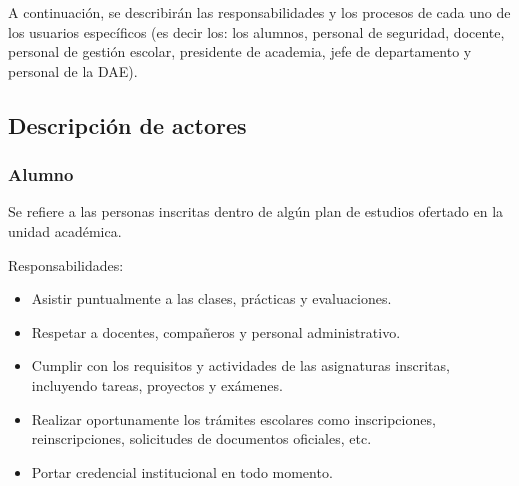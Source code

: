 A continuación, se describirán las responsabilidades y los procesos de cada uno de los usuarios específicos (es decir los: los alumnos, personal de seguridad, docente, personal de gestión escolar, presidente de academia, jefe de departamento y personal de la DAE).






\newpage

\subsection{Descripción de actores}

\begin{Usuario}{\hypertarget{tAlumno}{\subsubsection{Alumno}}}{
		Se refiere a las personas inscritas dentro de algún plan de estudios ofertado en la unidad académica.
	}
	\item[Responsabilidades:] \cdtEmpty
	\begin{itemize}
		\item Asistir puntualmente a las clases, prácticas y evaluaciones.
		\item Respetar a docentes, compañeros y personal administrativo.
		\item Cumplir con los requisitos y actividades de las asignaturas inscritas, incluyendo tareas, proyectos y exámenes.
		\item Realizar oportunamente los trámites escolares como inscripciones, reinscripciones, solicitudes de documentos oficiales, etc.
		\item Portar credencial institucional en todo momento.
	\end{itemize}
	

\end{Usuario}

